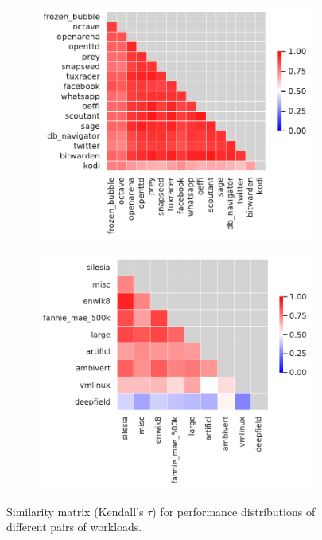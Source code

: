 \begin{figure}
\begin{subfigure}{0.33\textwidth}
		\centering
		\includegraphics[width=\linewidth]{images/rq1/kendall_jadx.pdf}
		\caption{\jadx}
	\end{subfigure}
	\begin{subfigure}{0.33\textwidth}
		\centering
		\includegraphics[width=\linewidth]{images/rq1/kendall_kanzi.pdf}
		\caption{\kanzi}
	\end{subfigure}
	\caption{Similarity matrix (Kendall's $\tau$) for performance distributions of different pairs of workloads.}
	\label{fig:diff_performance_similarity}
\end{figure}
\vspace{1em}

